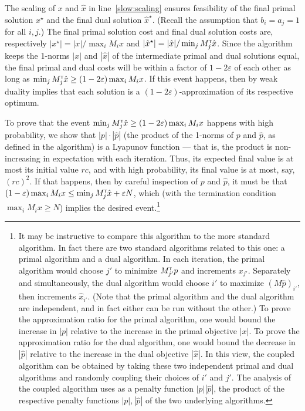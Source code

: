 \documentclass[11pt]{svjour3} \usepackage{fullpage}
\newcommand{\primalOf}[1]{{{#1}}}
\newcommand{\dualOf}[1]{{\hat{#1}}}
\newcommand{\xp}{\primalOf x}
\newcommand{\pp}{\primalOf p}
\newcommand{\xd}{\dualOf x}
\newcommand{\pd}{\dualOf p}
\newcommand{\eps}{\varepsilon}
\newcommand{\tran}{^{\scriptscriptstyle \sf T\hspace*{-0.05em}}}
\begin{document}
\smallskip
The scaling of $\xp$ and $\xd$ in line~\ref{slow:scaling} ensures feasibility of the final primal solution $\xp^\star$ and the final dual solution $\xd^\star$.
(Recall the assumption that $b_i = a_j = 1$ for all $i, j$.)
The final primal solution cost and final dual solution costs are, respectively $|\xp^\star| = |\xp|/\max_i M_i\xp$ and $|\xd^\star| = |\xd|/ \min_jM\tran_j\xd$.
Since the algorithm keeps the 1-norms $|\xp|$ and $|\xd|$ of the intermediate primal and dual solutions equal, the final primal and dual costs will be within a factor of $1-2\eps$ of each other as long as $\min_jM\tran_j\xd \ge (1-2\eps)\max_i M_i\xp$.
If this event happens, then by weak duality implies that each solution is a $(1-2\eps)$-approximation of its respective optimum.

To prove that the event
$\min_jM\tran_j\xd \ge (1-2\eps)\max_i M_i\xp$
happens with high probability,
we show that  $|\pp|\cdot|\pd|$ (the product of the 1-norms of $\pp$ and $\pd$,
as defined in the algorithm) is a Lyapunov function --- that is, the product  is non-increasing in expectation with each iteration.
Thus, its expected final value is at most its initial value $rc$,
and with high probability, its final value is at most, say, $(rc)^2$.
If that happens, then by careful inspection of $\pp$ and $\pd$,
it must be that $(1-\eps)\max_i M_i \xp \le \min_j M\tran_j \xd + \eps N$,
which (with the termination condition $\max_i M_i x \ge N$) implies the desired event.\footnote
{It may be instructive to compare this algorithm to the more standard algorithm.
In fact there are two standard algorithms related to this one: a primal algorithm and a dual algorithm.
In each iteration, the primal algorithm would choose $j'$ to minimize $M\tran_{j'}\pp$
and increments $\xp_{j'}$.
Separately and simultaneously, the dual algorithm would choose $i'$ to maximize $(M\pd)_{i'}$,
then increments $\xd_{i'}$.
(Note that the primal algorithm and the dual algorithm are independent,
and in fact either can be run without the other.)
To prove the approximation ratio for the primal algorithm, one would bound the increase in $|\pp|$ relative to the increase in the primal objective $|\xp|$.
To prove the approximation ratio for the dual algorithm, one would bound the decrease in $|\pd|$ relative to the increase in the dual objective $|\xd|$.
In this view, the coupled algorithm can be obtained by taking these two independent primal and dual algorithms
and randomly coupling their choices of $i'$ and $j'$.
The analysis of the coupled algorithm uses as a penalty function $|\pp||\pd|$,
the product of the respective penalty functions $|\pp|,|\pd|$ of the two underlying algorithms.
}
\end{document}
